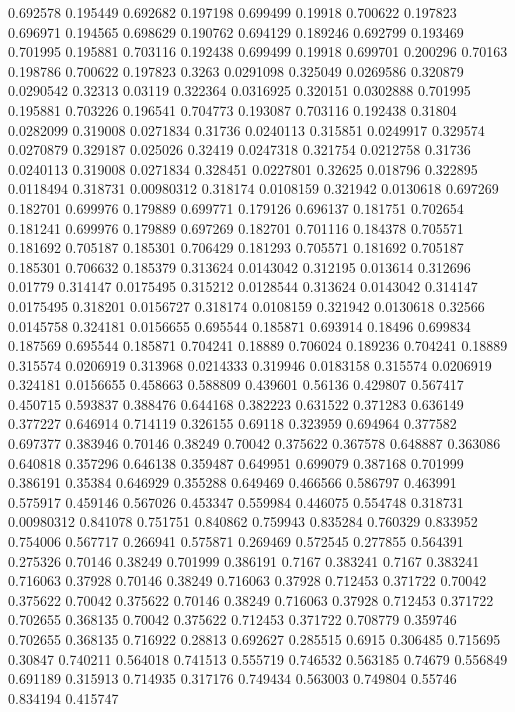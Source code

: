 0.692578 0.195449
0.692682 0.197198
0.699499 0.19918
0.700622 0.197823
0.696971 0.194565
0.698629 0.190762
0.694129 0.189246
0.692799 0.193469
0.701995 0.195881
0.703116 0.192438
0.699499 0.19918
0.699701 0.200296
0.70163 0.198786
0.700622 0.197823
0.3263 0.0291098
0.325049 0.0269586
0.320879 0.0290542
0.32313 0.03119
0.322364 0.0316925
0.320151 0.0302888
0.701995 0.195881
0.703226 0.196541
0.704773 0.193087
0.703116 0.192438
0.31804 0.0282099
0.319008 0.0271834
0.31736 0.0240113
0.315851 0.0249917
0.329574 0.0270879
0.329187 0.025026
0.32419 0.0247318
0.321754 0.0212758
0.31736 0.0240113
0.319008 0.0271834
0.328451 0.0227801
0.32625 0.018796
0.322895 0.0118494
0.318731 0.00980312
0.318174 0.0108159
0.321942 0.0130618
0.697269 0.182701
0.699976 0.179889
0.699771 0.179126
0.696137 0.181751
0.702654 0.181241
0.699976 0.179889
0.697269 0.182701
0.701116 0.184378
0.705571 0.181692
0.705187 0.185301
0.706429 0.181293
0.705571 0.181692
0.705187 0.185301
0.706632 0.185379
0.313624 0.0143042
0.312195 0.013614
0.312696 0.01779
0.314147 0.0175495
0.315212 0.0128544
0.313624 0.0143042
0.314147 0.0175495
0.318201 0.0156727
0.318174 0.0108159
0.321942 0.0130618
0.32566 0.0145758
0.324181 0.0156655
0.695544 0.185871
0.693914 0.18496
0.699834 0.187569
0.695544 0.185871
0.704241 0.18889
0.706024 0.189236
0.704241 0.18889
0.315574 0.0206919
0.313968 0.0214333
0.319946 0.0183158
0.315574 0.0206919
0.324181 0.0156655
0.458663 0.588809
0.439601 0.56136
0.429807 0.567417
0.450715 0.593837
0.388476 0.644168
0.382223 0.631522
0.371283 0.636149
0.377227 0.646914
0.714119 0.326155
0.69118 0.323959
0.694964 0.377582
0.697377 0.383946
0.70146 0.38249
0.70042 0.375622
0.367578 0.648887
0.363086 0.640818
0.357296 0.646138
0.359487 0.649951
0.699079 0.387168
0.701999 0.386191
0.35384 0.646929
0.355288 0.649469
0.466566 0.586797
0.463991 0.575917
0.459146 0.567026
0.453347 0.559984
0.446075 0.554748
0.318731 0.00980312
0.841078 0.751751
0.840862 0.759943
0.835284 0.760329
0.833952 0.754006
0.567717 0.266941
0.575871 0.269469
0.572545 0.277855
0.564391 0.275326
0.70146 0.38249
0.701999 0.386191
0.7167 0.383241
0.7167 0.383241
0.716063 0.37928
0.70146 0.38249
0.716063 0.37928
0.712453 0.371722
0.70042 0.375622
0.70042 0.375622
0.70146 0.38249
0.716063 0.37928
0.712453 0.371722
0.702655 0.368135
0.70042 0.375622
0.712453 0.371722
0.708779 0.359746
0.702655 0.368135
0.716922 0.28813
0.692627 0.285515
0.6915 0.306485
0.715695 0.30847
0.740211 0.564018
0.741513 0.555719
0.746532 0.563185
0.74679 0.556849
0.691189 0.315913
0.714935 0.317176
0.749434 0.563003
0.749804 0.55746
0.834194 0.415747
